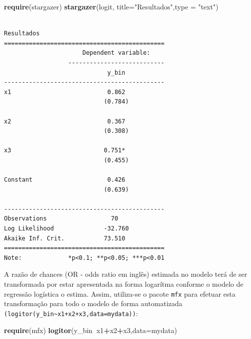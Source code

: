 \documentclass[12pt,brazil,oneside]{book}
\newenvironment{Shaded}{\begin{snugshade}}{\end{snugshade}}
\newcommand{\DataTypeTok}[1]{\textcolor[rgb]{0.13,0.29,0.53}{#1}}
\newcommand{\KeywordTok}[1]{\textcolor[rgb]{0.13,0.29,0.53}{\textbf{#1}}}
\newcommand{\NormalTok}[1]{#1}
\newcommand{\OperatorTok}[1]{\textcolor[rgb]{0.81,0.36,0.00}{\textbf{#1}}}
\newcommand{\StringTok}[1]{\textcolor[rgb]{0.31,0.60,0.02}{#1}}
\begin{document}
\begin{Shaded}
\begin{Highlighting}[]
\KeywordTok{require}\NormalTok{(stargazer)}
\KeywordTok{stargazer}\NormalTok{(logit, }\DataTypeTok{title=}\StringTok{"Resultados"}\NormalTok{,}\DataTypeTok{type =} \StringTok{"text"}\NormalTok{)}
\end{Highlighting}
\end{Shaded}

\begin{verbatim}

Resultados
=============================================
                      Dependent variable:    
                  ---------------------------
                             y_bin           
---------------------------------------------
x1                           0.862           
                            (0.784)          
                                             
x2                           0.367           
                            (0.308)          
                                             
x3                          0.751*           
                            (0.455)          
                                             
Constant                     0.426           
                            (0.639)          
                                             
---------------------------------------------
Observations                  70             
Log Likelihood              -32.760          
Akaike Inf. Crit.           73.510           
=============================================
Note:             *p<0.1; **p<0.05; ***p<0.01
\end{verbatim}

A razão de chances (OR - odds ratio em inglês) estimada no modelo terá de ser transformada por estar apresentada na forma logarítma conforme o modelo de regressão logística o estima. Assim, utiliza-se o pacote \texttt{mfx} para efetuar esta transformação para todo o modelo de forma automatizada \texttt{(logitor(y\_bin\textasciitilde{}x1+x2+x3,data=mydata))}:

\begin{Shaded}
\begin{Highlighting}[]
\KeywordTok{require}\NormalTok{(mfx)}
\KeywordTok{logitor}\NormalTok{(y_bin}\OperatorTok{~}\NormalTok{x1}\OperatorTok{+}\NormalTok{x2}\OperatorTok{+}\NormalTok{x3,}\DataTypeTok{data=}\NormalTok{mydata)}
\end{Highlighting}
\end{Shaded}
\end{document}
